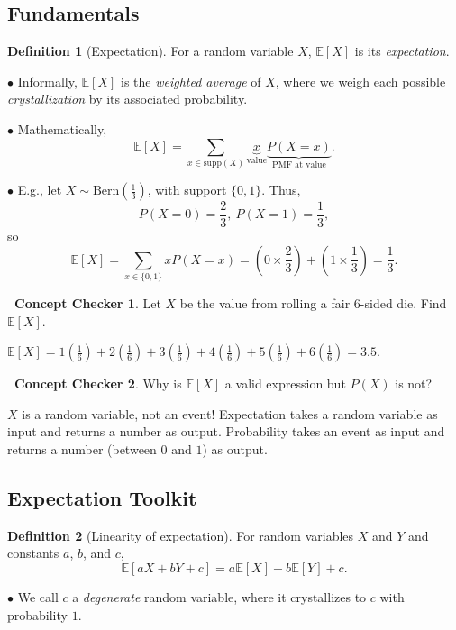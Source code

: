 \documentclass[12pt,oneside]{article}
\newcommand{\E}{\mathbb{E}}
\newcommand{\supp}{\text{supp}}
\newcommand{\Bern}{\text{Bern}}
\theoremstyle{definition}
\newtheorem{definition}{Definition}
\newtheorem{concept}{\faPen \ Concept Checker}
\theoremstyle{remark}
\begin{document}
\subsection{Fundamentals}

\begin{definition}[Expectation]
For a random variable $X$, $\E[X]$ is its \textit{expectation}.

$\bullet$ Informally, $\E[X]$ is the \textit{weighted average} of $X$, where we weigh each possible \textit{crystallization} by its associated probability.

$\bullet$ Mathematically, \[\E[X] = \sum_{x \in \supp(X)} \underbrace{x}_{\text{value}} \underbrace{P(X = x)}_{\text{PMF at value}}.\]

$\bullet$ E.g., let $X \sim \Bern(\frac{1}{3})$, with support $\{0, 1\}$. Thus, \[P(X = 0) = \frac{2}{3}, \ P(X = 1) = \frac{1}{3},\] so \[\E[X] = \sum_{x \in \{0, 1\}} x P(X = x) = \left( 0 \times \frac{2}{3} \right) + \left( 1 \times \frac{1}{3} \right) = \frac{1}{3}.\]
\end{definition}

\begin{concept}
Let $X$ be the value from rolling a fair 6-sided die. Find $\E[X]$.
\end{concept}

\begin{solutionbox}
$\E[X] = 1(\frac{1}{6}) + 2(\frac{1}{6}) + 3(\frac{1}{6}) + 4(\frac{1}{6}) + 5(\frac{1}{6}) + 6(\frac{1}{6}) = 3.5$.
\end{solutionbox}

\begin{concept}
Why is $\E[X]$ a valid expression but $P(X)$ is not?
\end{concept}

\begin{solutionbox}
$X$ is a random variable, not an event! Expectation takes a random variable as input and returns a number as output. Probability takes an event as input and returns a number (between $0$ and $1$) as output.
\end{solutionbox}

\subsection{Expectation Toolkit}

\begin{definition}[Linearity of expectation]
For random variables $X$ and $Y$ and constants $a$, $b$, and $c$, \[\E[aX + bY + c] = a \E[X] + b \E[Y] + c.\]

$\bullet$ We call $c$ a \textit{degenerate} random variable, where it crystallizes to $c$ with probability $1$.
\end{definition}
\end{document}

